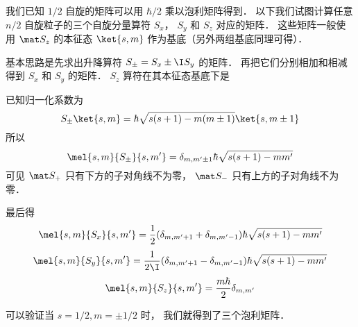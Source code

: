 

我们已知 $1/2$ 自旋的矩阵可以用 $\hbar/2$ 乘以泡利矩阵得到． 以下我们试图计算任意 $n/2$ 自旋粒子的三个自旋分量算符 $S_x$， $S_y$ 和 $S_z$ 对应的矩阵． 这些矩阵一般使用 $\mat S_z$ 的本征态 $\ket{s, m}$ 作为基底（另外两组基底同理可得）．

基本思路是先求出升降算符 $S_\pm = S_x \pm \I S_y$ 的矩阵． 再把它们分别相加和相减得到 $S_x$ 和 $S_y$ 的矩阵． $S_z$ 算符在其本征态基底下是

已知归一化系数为
\begin{equation}
S_\pm \ket{s,m} = \hbar \sqrt{s(s + 1) - m(m \pm 1)} \ket{s,m\pm1}
\end{equation}
所以
\begin{equation}
\mel{s,m}{S_\pm}{s,m'} = \delta_{m, m'\pm1} \hbar \sqrt{s(s + 1) - mm'}
\end{equation}
可见 $\mat S_+$ 只有下方的子对角线不为零， $\mat S_-$ 只有上方的子对角线不为零．

最后得
\begin{equation}
\mel{s,m}{S_x}{s,m'} = \frac12(\delta_{m, m'+1} + \delta_{m, m'-1})\hbar \sqrt{s(s + 1) - mm'} 
\end{equation}
\begin{equation}
\mel{s,m}{S_y}{s,m'} = \frac{1}{2\I}(\delta_{m, m'+1} - \delta_{m, m'-1}) \hbar \sqrt{s(s + 1) - mm'}
\end{equation}
\begin{equation}
\mel{s,m}{S_z}{s,m'} = \frac{m\hbar}{2}\delta_{m,m'}
\end{equation}

可以验证当 $s = 1/2, m = \pm1/2$ 时， 我们就得到了三个泡利矩阵．
